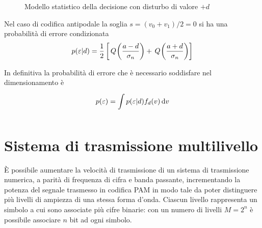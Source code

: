 \begin{figure}[ht!]\centering
	\caption{Modello statistico della decisione con disturbo di valore $+d$}
	\label{fig:trasmissione_numerica_modello_statistico_decisione_disturbo}
\end{figure}

Nel caso di codifica antipodale la soglia $s=(v_0+v_1)/2=0$ si ha una probabilità di errore condizionata
\begin{equation}
p(\varepsilon|d)=\frac{1}{2}\left[\,{Q}^{}\!\left({\frac{a-d}{\sigma_n}}\right)+\,{Q}^{}\!\left({\frac{a+d}{\sigma_n}}\right)\right]
\end{equation}

In definitiva la probabilità di errore che è necessario soddisfare nel dimensionamento è
\begin{equation}
p(\varepsilon)=\int\limits_{}^{}{p(\varepsilon|d)f_d(v)}{\,\mathop{}\!\mathrm{d}{v}}
\end{equation}


\section{Sistema di trasmissione multilivello}
\`{E} possibile aumentare la velocità di trasmissione di un sistema di trasmissione numerica, a parità di frequenza di cifra e banda passante, incrementando la potenza del segnale trasmesso in codifica \acf{PAM} in modo tale da poter distinguere più livelli di ampiezza di una stessa forma d'onda. Ciascun livello rappresenta un simbolo a cui sono associate più cifre binarie: con un numero di livelli $M=2^n$ è possibile associare $n$ bit ad ogni simbolo.

